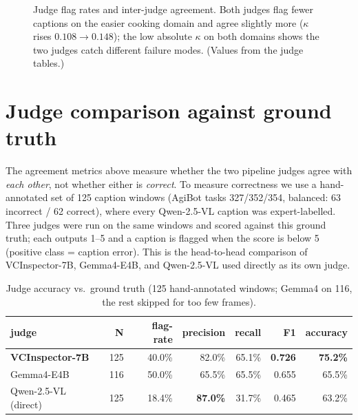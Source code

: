 \documentclass[10pt,letterpaper]{article}
\begin{document}
\begin{figure}[H]
\centering
{}
\caption{Judge flag rates and inter-judge agreement. Both judges flag fewer captions on the
easier cooking domain and agree slightly more ($\kappa$ rises $0.108 \to 0.148$); the low absolute
$\kappa$ on both domains shows the two judges catch different failure modes. (Values from the
judge tables.)}
\end{figure}

\section{Judge comparison against ground truth}\label{sec:judgegt}

The agreement metrics above measure whether the two pipeline judges agree with \emph{each other},
not whether either is \emph{correct}. To measure correctness we use a hand-annotated set of 125
caption windows (AgiBot tasks 327/352/354, balanced: 63 incorrect / 62 correct), where every
Qwen-2.5-VL caption was expert-labelled. Three judges were run on the same windows and scored
against this ground truth; each outputs 1--5 and a caption is flagged when the score is below 5
(positive class = caption error). This is the head-to-head comparison of VCInspector-7B,
Gemma4-E4B, and Qwen-2.5-VL used directly as its own judge.

\begin{table}[H]
\centering
\caption{Judge accuracy vs.\ ground truth (125 hand-annotated windows; Gemma4 on 116, the rest
skipped for too few frames).}
\begin{tabular}{lrrrrrr}
\toprule
judge & N & flag-rate & precision & recall & F1 & accuracy \\
\midrule
\textbf{VCInspector-7B} & 125 & 40.0\% & 82.0\% & 65.1\% & \textbf{0.726} & \textbf{75.2\%} \\
Gemma4-E4B             & 116 & 50.0\% & 65.5\% & 65.5\% & 0.655 & 65.5\% \\
Qwen-2.5-VL (direct)   & 125 & 18.4\% & \textbf{87.0\%} & 31.7\% & 0.465 & 63.2\% \\
\bottomrule
\end{tabular}
\end{table}
\end{document}
